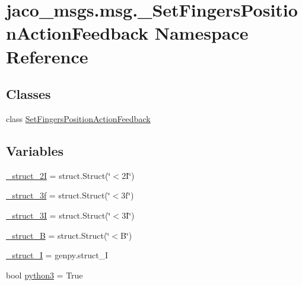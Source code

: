 \hypertarget{namespacejaco__msgs_1_1msg_1_1__SetFingersPositionActionFeedback}{}\section{jaco\+\_\+msgs.\+msg.\+\_\+\+Set\+Fingers\+Position\+Action\+Feedback Namespace Reference}
\label{namespacejaco__msgs_1_1msg_1_1__SetFingersPositionActionFeedback}
\subsection*{Classes}
\begin{DoxyCompactItemize}
\item 
class \hyperlink{classjaco__msgs_1_1msg_1_1__SetFingersPositionActionFeedback_1_1SetFingersPositionActionFeedback}{Set\+Fingers\+Position\+Action\+Feedback}
\end{DoxyCompactItemize}
\subsection*{Variables}
\begin{DoxyCompactItemize}
\item 
\hyperlink{namespacejaco__msgs_1_1msg_1_1__SetFingersPositionActionFeedback_a5df1c9356245186248bcfaa42991f72c}{\+\_\+struct\+\_\+2I} = struct.\+Struct(\char`\"{}$<$2\+I\char`\"{})
\item 
\hyperlink{namespacejaco__msgs_1_1msg_1_1__SetFingersPositionActionFeedback_ace03f2cf614c616b92cd84b23443670c}{\+\_\+struct\+\_\+3f} = struct.\+Struct(\char`\"{}$<$3f\char`\"{})
\item 
\hyperlink{namespacejaco__msgs_1_1msg_1_1__SetFingersPositionActionFeedback_a69a523550a127ac30a330417e6b67a19}{\+\_\+struct\+\_\+3I} = struct.\+Struct(\char`\"{}$<$3\+I\char`\"{})
\item 
\hyperlink{namespacejaco__msgs_1_1msg_1_1__SetFingersPositionActionFeedback_aa1fd11ca9874e55427a03337a3ce9bf6}{\+\_\+struct\+\_\+B} = struct.\+Struct(\char`\"{}$<$B\char`\"{})
\item 
\hyperlink{namespacejaco__msgs_1_1msg_1_1__SetFingersPositionActionFeedback_a9937b0d91dbeeb1d062d66957a155602}{\+\_\+struct\+\_\+I} = genpy.\+struct\+\_\+I
\item 
bool \hyperlink{namespacejaco__msgs_1_1msg_1_1__SetFingersPositionActionFeedback_a97679b60bf6747d0789e8d4d3c0a201d}{python3} = True
\end{DoxyCompactItemize}


